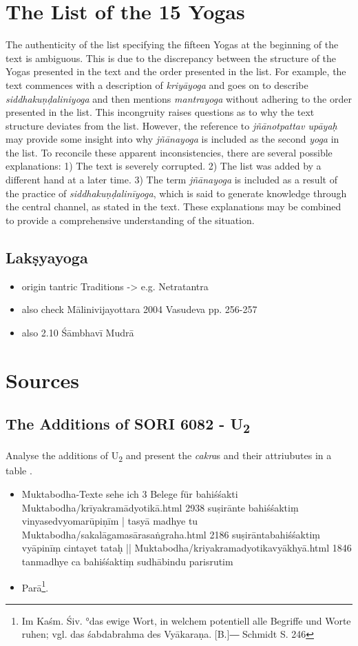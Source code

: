 \chapter{The List of the 15 Yogas}
\label{yogas_list}
The authenticity of the list specifying the fifteen Yogas at the beginning of the text is ambiguous. This is due to the discrepancy between the structure of the Yogas presented in the text and the order presented in the list. For example, the text commences with a description of \textit{kriyāyoga} and goes on to describe \textit{siddhakuṇḍaliniyoga} and then mentions \textit{mantrayoga} without adhering to the order presented in the list. This incongruity raises questions as to why the text structure deviates from the list. However, the reference to \textit{jñānotpattav upāyaḥ} may provide some insight into why \textit{jñānayoga} is included as the second \textit{yoga} in the list. To reconcile these apparent inconsistencies, there are several possible explanations: 1) The text is severely corrupted. 2) The list was added by a different hand at a later time. 3) The term \textit{jñānayoga} is included as a result of the practice of \textit{siddhakuṇḍalinīyoga}, which is said to generate knowledge through the central channel, as stated in the text. These explanations may be combined to provide a comprehensive understanding of the situation.

\section{Lakṣyayoga}

\begin{itemize}
\item origin tantric Traditions -> e.g. Netratantra
\item also check Mālinivijayottara 2004 Vasudeva pp. 256-257
\item also  2.10 Śāmbhavī Mudrā
  \end{itemize} 

\chapter{Sources}
\section{The Additions of  SORI 6082 - U\textsubscript{2}}
\label{discussionu2}
Analyse the additions of U\textsubscript{2} and present the \textit{cakra}s and their attriubutes in a table .
\begin{itemize}
\item  Muktabodha-Texte sehe ich 3 Belege für bahiśśakti Muktabodha/krīyakramādyotikā.html 2938 suṣirānte bahiśśaktiṃ vinyasedvyomarūpiṇīm | tasyā madhye tu Muktabodha/sakalāgamasārasaṅgraha.html 2186 suṣirāntabahiśśaktiṃ vyāpinīṃ cintayet tataḥ || Muktabodha/kriyakramadyotikavyākhyā.html 1846 tanmadhye ca bahiśśaktiṃ sudhābindu parisrutim
  \item  Parā\footnote{Im Kaśm. Śiv. °das ewige Wort, in welchem potentiell alle Begriffe und Worte ruhen; vgl. das śabdabrahma des Vyākaraṇa. [B.]― Schmidt S. 246}.
  \end{itemize}

